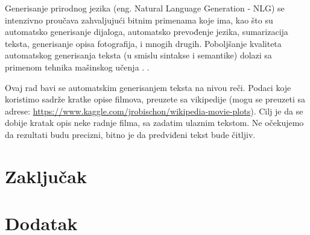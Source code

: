 \documentclass[a4paper]{article}
\begin{document}
Generisanje prirodnog jezika (eng. Natural Language Generation - NLG) se intenzivno proučava zahvaljujući bitnim primenama koje ima, kao što su automatsko generisanje dijaloga, automatsko prevođenje jezika, sumarizacija teksta, generisanje opisa fotografija, i mnogih drugih. Poboljšanje kvaliteta automatskog generisanja teksta (u smislu sintakse i semantike) dolazi sa primenom tehnika mašinskog učenja \cite{wang2018automatic}. .

Ovaj rad bavi se automatskim generisanjem teksta na nivou reči. Podaci koje koristimo sadrže kratke opise filmova, preuzete sa vikipedije (mogu se preuzeti sa adrese: \url{https://www.kaggle.com/jrobischon/wikipedia-movie-plots}). Cilj je da se dobije kratak opis neke radnje filma, sa zadatim ulaznim tekstom. Ne očekujemo da rezultati budu precizni, bitno je da predviđeni tekst bude čitljiv.




\section{Zaključak}
\label{sec:zakljucak}




\appendix
 


\appendix
\section{Dodatak}
\end{document}
